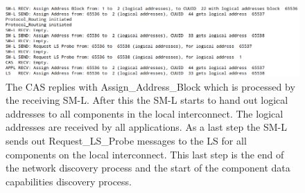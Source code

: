 \begin{figure}[ht]
    \centering
    \includegraphics[width=\textwidth]{figures/code_part_2}
    \caption{The CAS replies with Assign\_Address\_Block which is processed by
    the receiving SM-L. After this the SM-L starts to hand out logical
addresses to all components in the local interconnect. The logical addresses
are received by all applications. As a last step the SM-L sends out
Request\_LS\_Probe messages to the LS for all components on the local
interconnect. This last step is the end of the network discovery process and
the start of the component data capabilities discovery process.}
    \label{fig:code_part_2}
\end{figure}
